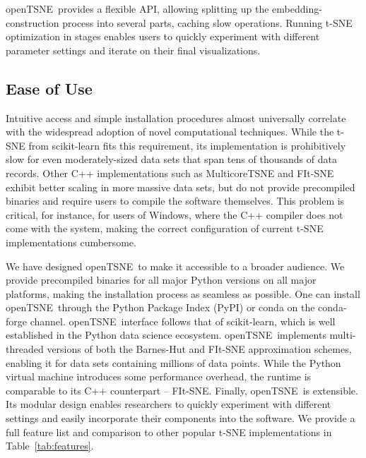 \documentclass[twocolumn]{bmcart}
\newcommand{\opentsne}{\textsf{openTSNE}}
\begin{document}
\opentsne\ provides a flexible API, allowing splitting up the embedding-construction process into several parts, caching slow operations. Running t-SNE optimization in stages enables users to quickly experiment with different parameter settings and iterate on their final visualizations.

\subsection*{Ease of Use}

Intuitive access and simple installation procedures almost universally correlate with the widespread adoption of novel computational techniques. While the t-SNE from \textsf{scikit-learn} fits this requirement, its implementation is prohibitively slow for even moderately-sized data sets that span tens of thousands of data records. Other C++ implementations such as \textsf{MulticoreTSNE} and \textsf{FIt-SNE} exhibit better scaling in more massive data sets, but do not provide precompiled binaries and require users to compile the software themselves. This problem is critical, for instance, for users of Windows, where the C++ compiler does not come with the system, making the correct configuration of current t-SNE implementations cumbersome.

We have designed \opentsne\ to make it accessible to a broader audience. We provide precompiled binaries for all major Python versions on all major platforms, making the installation process as seamless as possible. One can install \opentsne\ through the Python Package Index (PyPI) or conda on the conda-forge channel. \opentsne\ interface follows that of \textsf{scikit-learn}, which is well established in the Python data science ecosystem. \opentsne\ implements multi-threaded versions of both the Barnes-Hut and FIt-SNE approximation schemes, enabling it for data sets containing millions of data points. While the Python virtual machine introduces some performance overhead, the runtime is comparable to its C++ counterpart -- \textsf{FIt-SNE}. Finally, \opentsne\ is extensible. Its modular design enables researchers to quickly experiment with different settings and easily incorporate their components into the software. We provide a full feature list and comparison to other popular t-SNE implementations in Table~\ref{tab:features}.
\end{document}
